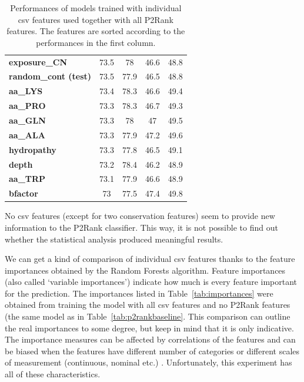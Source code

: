 \begin{table}[]
{\begin{tabular}{lcccc}
\textbf{exposure\_CN}         & 73.5           & 78                 & 46.6           & 48.8               \\
\textbf{random\_cont (test)}         & 73.5           & 77.9               & 46.5           & 48.8               \\
\textbf{aa\_LYS}              & 73.4           & 78.3               & 46.6           & 49.4               \\
\textbf{aa\_PRO}              & 73.3           & 78.3               & 46.7           & 49.3               \\
\textbf{aa\_GLN}              & 73.3           & 78                 & 47             & 49.5               \\
\textbf{aa\_ALA}              & 73.3           & 77.9               & 47.2           & 49.6               \\
\textbf{hydropathy}           & 73.3           & 77.8               & 46.5           & 49.1               \\
\textbf{depth}                & 73.2           & 78.4               & 46.2           & 48.9               \\
\textbf{aa\_TRP}              & 73.1           & 77.9               & 46.6           & 48.9               \\
\textbf{bfactor}              & 73             & 77.5               & 47.4           & 49.8               \\ \hline
\end{tabular}
}
\caption{Performances of models trained with individual csv features used together with all P2Rank features. The features are sorted according to the performances in the first column.}
\label{tab:p2rankCSV}
\end{table}

No csv features (except for two conservation features) seem to provide new information to the P2Rank classifier. This way, it is not possible to find out whether the statistical analysis produced meaningful results.

We can get a kind of comparison of individual csv features thanks to the feature importances obtained by the Random Forests algorithm. Feature importances (also called `variable importances') indicate how much is every feature important for the prediction. The importances listed in Table~\ref{tab:importances} were obtained from training the model with all csv features and no P2Rank features (the same model as in Table~\ref{tab:p2rankbaseline}. This comparison can outline the real importances to some degree, but keep in mind that it is only indicative. The importance measures can be affected by correlations of the features \cite{variableimportance} and can be biased when the features have different number of categories or different scales of measurement (continuous, nominal etc.)  \cite{bias_importance}. Unfortunately, this experiment has all of these characteristics.

